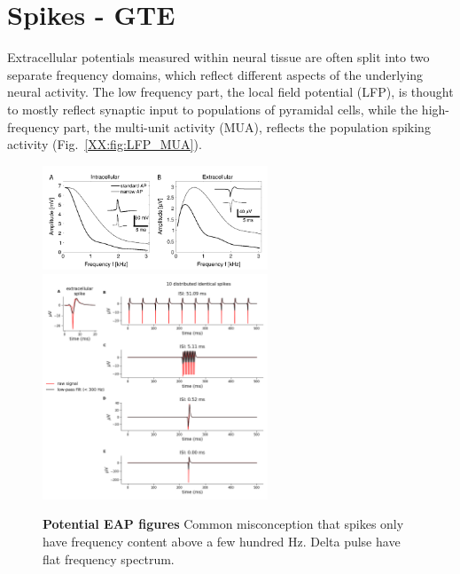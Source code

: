 \section{Spikes - GTE}
\label{sec:Spikes}
Extracellular potentials measured within neural tissue are often split into two separate frequency domains, which reflect different aspects of the underlying neural activity. The low frequency part, the local field potential (LFP), is thought to mostly reflect synaptic input to populations of pyramidal cells, while the high-frequency part, the multi-unit activity (MUA), reflects the population spiking activity (Fig.~\ref{XX:fig:LFP_MUA}).
\begin{figure}[!ht]
\begin{center}
\includegraphics[width=0.6\textwidth]{Figures/Spikes/Spikes-eap_illustration.png}
\includegraphics[width=0.6\textwidth]{Figures/Spikes/Spikes-LFP_spike_effect_test_300Hz.png}
\end{center}
\caption{\textbf{Potential EAP figures} 
Common misconception that spikes only have frequency content above a few hundred Hz. Delta pulse have flat frequency spectrum.}
\label{Spikes:fig:freq_dep}
\end{figure}

\subsection{}
\label{Spikes:sec:EP-spikes}
%


